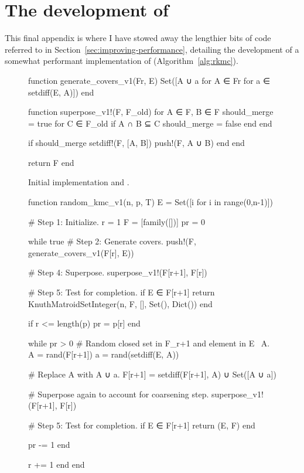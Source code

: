 \chapter{The development of \texorpdfstring{}{random\_kmc}}
\label{apx:rkmc_dev}
This final appendix is where I have stowed away the lengthier bits of code referred to in Section~\ref{sec:improving-performance}, detailing the development of a somewhat performant implementation of  (Algorithm~\ref{alg:rkmc}).

\begin{figure}
  \begin{jllisting}
function generate_covers_v1(Fr, E)
  Set([A ∪ a for A ∈ Fr for a ∈ setdiff(E, A)])
end

function superpose_v1!(F, F_old)
  for A ∈ F, B ∈ F
    should_merge = true
    for C ∈ F_old if A ∩ B ⊆ C
      should_merge = false
    end end

    if should_merge
      setdiff!(F, [A, B])
      push!(F, A ∪ B)
    end
  end

  return F
end
  \end{jllisting}
  \caption{Initial implementation  and .}
  \label{code:rkmc_v1_a}
\end{figure}

\begin{figure}
  \begin{jllisting}
function random_kmc_v1(n, p, T)
  E = Set([i for i in range(0,n-1)])
  
  # Step 1: Initialize.
  r = 1
  F = [family([])]
  pr = 0
  
  while true
    # Step 2: Generate covers.
    push!(F, generate_covers_v1(F[r], E))
    
    # Step 4: Superpose.
    superpose_v1!(F[r+1], F[r])
    
    # Step 5: Test for completion.
    if E ∈ F[r+1]
      return KnuthMatroid{Set{Integer}}(n, F, [], Set(), Dict())
    end
    
    if r <= length(p)
      pr = p[r]
    end
    
    while pr > 0
      # Random closed set in F_{r+1} and element in E \ A.
      A = rand(F[r+1])
      a = rand(setdiff(E, A))
      
      # Replace A with A ∪ {a}.
      F[r+1] = setdiff(F[r+1], A) ∪ Set([A ∪ a])
      
      # Superpose again to account for coarsening step.
      superpose_v1!(F[r+1], F[r])
      
      
      # Step 5: Test for completion.
      if E ∈ F[r+1]
        return (E, F)
      end
      
      pr -= 1
    end
    
    
    r += 1
  end
end
  \end{jllisting}
  \caption{}
  \label{code:rkmc_v1_b}
\end{figure}


